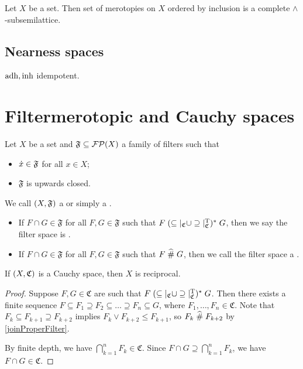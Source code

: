 \begin{proposition}
Let $X$ be a set. Then set of merotopies on $X$ ordered by inclusion is a complete $\wedge$-subsemilattice.
\end{proposition}

\subsection{Nearness spaces}
$\operatorname{adh}, \operatorname{inh}$ idempotent.

\section{Filtermerotopic and Cauchy spaces}
\begin{definition}
Let $X$ be a set and $\mathfrak{F}\subseteq \operatorname{\mathcal{FP}}(X)$ a family of filters such that
\begin{itemize}
\item $\dot{x} \in \mathfrak{F}$ for all $x\in X$;
\item $\mathfrak{F}$ is upwards closed.
\end{itemize}
We call $\sSet{X, \mathfrak{F}}$ a or simply a .

\begin{itemize}
\item If $F\cap G\in \mathfrak{F}$ for all $F,G\in \mathfrak{F}$ such that $F\mathrel{(\subseteq|_{\mathfrak{C}} \cup \supseteq|_{\mathfrak{C}}^{\mathrm{T}})^*} G$, then we say the filter space is .
\item If $F\cap G\in \mathfrak{F}$ for all $F,G\in \mathfrak{F}$ such that $F\mathrel{\widehat{\#}} G$, then we call the filter space a .
\end{itemize}
\end{definition}

\begin{lemma}
If $\sSet{X, \mathfrak{C}}$ is a Cauchy space, then $X$ is reciprocal.
\end{lemma}
\begin{proof}
Suppose $F,G\in \mathfrak{C}$ are such that $F\mathrel{(\subseteq|_{\mathfrak{C}} \cup \supseteq|_{\mathfrak{C}}^{\mathrm{T}})^*} G$. Then there exists a finite sequence $F \subseteq F_1 \supseteq F_2 \subseteq \ldots \supseteq F_n \subseteq G$, where $F_1, \ldots, F_n\in \mathfrak{C}$. Note that $F_k \subseteq F_{k+1} \supseteq F_{k+2}$ implies $F_k \vee F_{k+2} \leq F_{k+1}$, so $F_k \mathrel{\widehat{\#}} F_{k+2}$ by \ref{joinProperFilter}.

By finite depth, we have $\bigcap_{k=1}^n F_k\in \mathfrak{C}$. Since $F\cap G \supseteq \bigcap_{k=1}^n F_k$, we have $F\cap G\in \mathfrak{C}$.
\end{proof}


